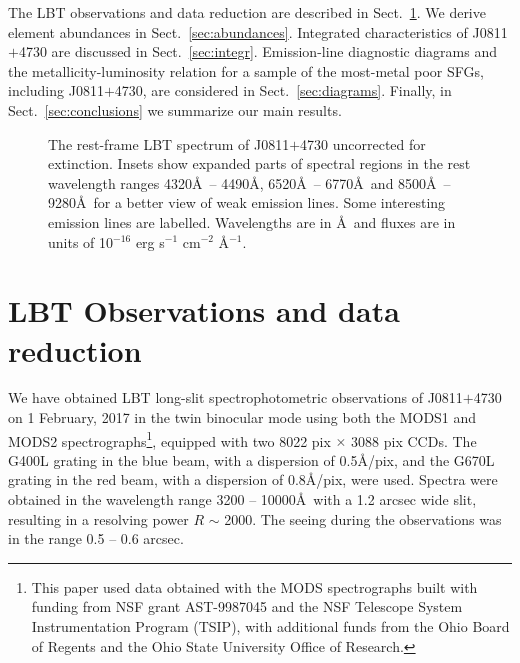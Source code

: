 \documentclass[useAMS,usenatbib]{mn2e}
\begin{document}
The LBT observations and data reduction are described in 
Sect.~\ref{sec:observations}. We derive element abundances in 
Sect.~\ref{sec:abundances}. Integrated characteristics of J0811$+$4730 are
discussed in Sect.~\ref{sec:integr}. Emission-line diagnostic diagrams and
the metallicity-luminosity relation for a sample of the most-metal poor
SFGs, including J0811$+$4730, are considered in Sect.~\ref{sec:diagrams}.
Finally, in Sect.~\ref{sec:conclusions} we summarize our main results.

\begin{figure*}%
\centering{
\texttt{[image: J0811+4730b\_2.ps]}
\texttt{[image: J0811+4730r\_2.ps]}}
\caption{The rest-frame LBT spectrum of J0811$+$4730 uncorrected for extinction.
Insets show expanded parts of spectral regions in the rest 
wavelength ranges 4320\AA\ -- 4490\AA, 6520\AA\ -- 6770\AA\ and 
8500\AA\ -- 9280\AA\ for a better
view of weak emission lines. Some interesting emission lines are 
labelled. Wavelengths are in \AA\ and fluxes are in 
units of 10$^{-16}$ erg s$^{-1}$ cm$^{-2}$ \AA$^{-1}$.}
\label{fig1}
\end{figure*}

\section{LBT Observations and data reduction}\label{sec:observations}

We have obtained LBT long-slit spectrophotometric observations of J0811$+$4730 
on 1 February, 2017 in the twin binocular mode using both the MODS1 and 
MODS2 spectrographs\footnote{This paper used data obtained with the MODS 
spectrographs built with
funding from NSF grant AST-9987045 and the NSF Telescope System
Instrumentation Program (TSIP), with additional funds from the Ohio
Board of Regents and the Ohio State University Office of Research.}, 
equipped with two 8022 pix $\times$ 3088 pix CCDs. The G400L grating in 
the blue beam, with a dispersion of 0.5\AA/pix, and the G670L grating in the 
red beam, with a dispersion of 0.8\AA/pix, were used. Spectra were obtained in 
the wavelength range 3200 -- 10000\AA\ with a 1.2 arcsec wide slit, 
resulting in a resolving power $R$ $\sim$ 2000. The seeing during 
the observations was in the range 0.5 -- 0.6 arcsec.
\end{document}

